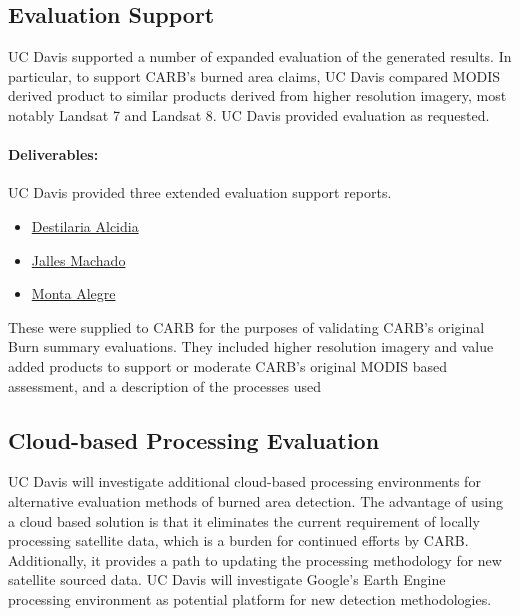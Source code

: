 \documentclass[]{article}
\begin{document}
\subsection{Evaluation Support}\label{evaluation-support}

UC Davis supported a number of expanded evaluation of the generated
results. In particular, to support CARB's burned area claims, UC Davis
compared MODIS derived product to similar products derived from higher
resolution imagery, most notably Landsat 7 and Landsat 8. UC Davis
provided evaluation as requested.

\paragraph{Deliverables:}\label{deliverables-2}

UC Davis provided three extended evaluation support reports.

\begin{itemize}
\itemsep1pt\parskip0pt
\item
  \href{Destilaria\%20Alcidia}{Destilaria Alcidia}
\item
  \href{Jalles\%20Machado}{Jalles Machado}
\item
  \href{Monta\%20Alegre}{Monta Alegre}
\end{itemize}

These were supplied to CARB for the purposes of validating CARB's
original Burn summary evaluations. They included higher resolution
imagery and value added products to support or moderate CARB's original
MODIS based assessment, and a description of the processes used

\subsection{Cloud-based Processing
Evaluation}\label{cloud-based-processing-evaluation}

UC Davis will investigate additional cloud-based processing environments
for alternative evaluation methods of burned area detection. The
advantage of using a cloud based solution is that it eliminates the
current requirement of locally processing satellite data, which is a
burden for continued efforts by CARB. Additionally, it provides a path
to updating the processing methodology for new satellite sourced data.
UC Davis will investigate Google's Earth Engine processing environment
as potential platform for new detection methodologies.
\end{document}
